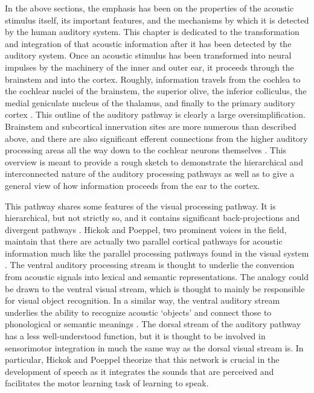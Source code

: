 \documentclass[titlepage]{article}
\begin{document}
  In the above sections, the emphasis has been on the properties of the acoustic stimulus itself, its important
  features, and the mechanisms by which it is detected by the human auditory system. This chapter is dedicated
  to the transformation and integration of that acoustic information after it has been detected by the auditory
  system. Once an acoustic stimulus has been transformed into neural impulses by the machinery of
  the inner and outer ear, it proceeds through the brainstem and into the cortex. Roughly, information travels
  from the cochlea to the cochlear nuclei of the brainstem, the superior olive, the inferior colliculus,
  the medial geniculate nucleus of the thalamus, and finally to the primary auditory cortex
  \cite{Hickok2007,Webster1992}. This outline of the auditory pathway is clearly a large oversimplification.
  Brainstem and subcortical innervation sites are more numerous than described above, and there are
  also significant efferent connections from the higher auditory processing areas all the way down to the
  cochlear neurons themselves \cite{Kandel2000,Webster1992}. This overview is meant to provide a rough sketch
  to demonstrate the hierarchical and interconnected nature of the auditory processing pathways as well as
  to give a general view of how information proceeds from the ear to the cortex.


  This pathway shares some features of the visual processing pathway. It is hierarchical, but not strictly so,
  and it contains significant back-projections and divergent pathways \cite{Webster1992,Hickok2007}.
  Hickok and Poeppel, two prominent voices in the field, maintain that there are actually two parallel cortical
  pathways for acoustic information much like the parallel processing pathways found in the visual system
  \cite{Hickok2007,Hickok2004,Hickok2000}. The ventral auditory processing stream is thought to underlie
  the conversion from acoustic signals into lexical and semantic representations. The analogy could be drawn
  to the ventral visual stream, which is thought to mainly be responsible for visual object recognition. In
  a similar way, the ventral auditory stream underlies the ability to recognize acoustic `objects' and
  connect those to phonological or semantic meanings \cite{Parker2005,Rauschecker2009}.
  The dorsal stream of the auditory pathway has a less well-understood function, but it is thought to be
  involved in sensorimotor integration in much the same way as the dorsal visual stream is. In particular,
  Hickok and Poeppel theorize that this network is crucial in the development of speech as it integrates the
  sounds that are perceived and facilitates the motor learning task of learning to speak.
\end{document}
